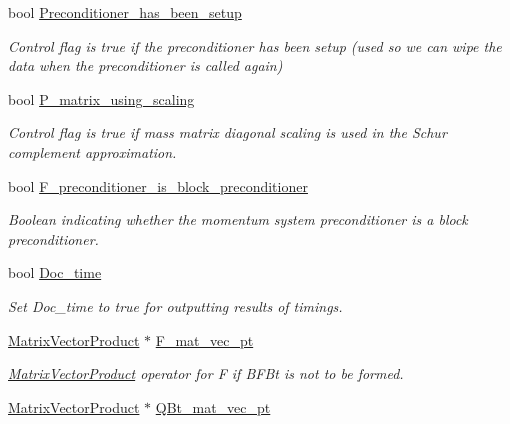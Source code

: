\begin{DoxyCompactItemize}
bool \hyperlink{classoomph_1_1PressureBasedSolidLSCPreconditioner_a36040d15eba392db2f29c503644a6ed2}{Preconditioner\+\_\+has\+\_\+been\+\_\+setup}
\begin{DoxyCompactList}\small\item\em Control flag is true if the preconditioner has been setup (used so we can wipe the data when the preconditioner is called again) \end{DoxyCompactList}\item 
bool \hyperlink{classoomph_1_1PressureBasedSolidLSCPreconditioner_af92907711de209fa924eeef614d48c4e}{P\+\_\+matrix\+\_\+using\+\_\+scaling}
\begin{DoxyCompactList}\small\item\em Control flag is true if mass matrix diagonal scaling is used in the Schur complement approximation. \end{DoxyCompactList}\item 
bool \hyperlink{classoomph_1_1PressureBasedSolidLSCPreconditioner_aa430d3786009f7ad9fd8009d5bc9430a}{F\+\_\+preconditioner\+\_\+is\+\_\+block\+\_\+preconditioner}
\begin{DoxyCompactList}\small\item\em Boolean indicating whether the momentum system preconditioner is a block preconditioner. \end{DoxyCompactList}\item 
bool \hyperlink{classoomph_1_1PressureBasedSolidLSCPreconditioner_a6bb97a362c82d3a363ffaaceb7a643a8}{Doc\+\_\+time}
\begin{DoxyCompactList}\small\item\em Set Doc\+\_\+time to true for outputting results of timings. \end{DoxyCompactList}\item 
\hyperlink{classoomph_1_1MatrixVectorProduct}{Matrix\+Vector\+Product} $\ast$ \hyperlink{classoomph_1_1PressureBasedSolidLSCPreconditioner_ad1ce11b9dc16c14f5eaf72eb841c08ef}{F\+\_\+mat\+\_\+vec\+\_\+pt}
\begin{DoxyCompactList}\small\item\em \hyperlink{classoomph_1_1MatrixVectorProduct}{Matrix\+Vector\+Product} operator for F if B\+F\+Bt is not to be formed. \end{DoxyCompactList}\item 
\hyperlink{classoomph_1_1MatrixVectorProduct}{Matrix\+Vector\+Product} $\ast$ \hyperlink{classoomph_1_1PressureBasedSolidLSCPreconditioner_a03338487e35713fc408e83b12f9ba8ac}{Q\+Bt\+\_\+mat\+\_\+vec\+\_\+pt}

\end{DoxyCompactItemize}
